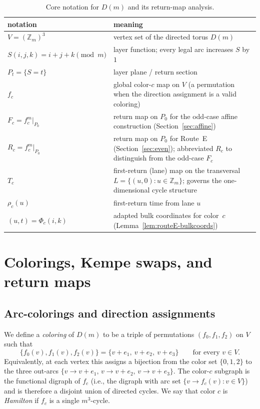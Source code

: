\documentclass[11pt]{article}
\begin{document}
\begin{table}[t]
\centering
\footnotesize
\begin{tabularx}{\textwidth}{@{}l>{\raggedright\arraybackslash}X@{}}
\toprule
notation & meaning \\
\midrule
$V=(\mathbb Z_m)^3$ & vertex set of the directed torus $D(m)$ \\
$S(i,j,k)=i+j+k\pmod m$ & layer function; every legal arc increases $S$ by $1$ \\
$P_t=\{S=t\}$ & layer plane / return section \\
$f_c$ & global color-$c$ map on $V$ (a permutation when the direction assignment is a valid coloring) \\
$F_c=f_c^m|_{P_0}$ & return map on $P_0$ for the odd-case affine construction (Section~\ref{sec:affine}) \\
$R_c=f_c^m|_{P_0}$ & return map on $P_0$ for Route~E (Section~\ref{sec:even}); abbreviated $R_c$ to distinguish from the odd-case $F_c$ \\
$T_c$ & first-return (lane) map on the transversal $L=\{(u,0):u\in\mathbb Z_m\}$; governs the one-dimensional cycle structure \\
$\rho_c(u)$ & first-return time from lane $u$ \\
$(u,t)=\Phi_c(i,k)$ & adapted bulk coordinates for color~$c$ (Lemma~\ref{lem:routeE-bulkcoords}) \\
\bottomrule
\end{tabularx}
\caption{Core notation for $D(m)$ and its return-map analysis.}
\label{tab:notation}
\end{table}

\section{Colorings, Kempe swaps, and return maps}\label{sec:prelim}

\subsection{Arc-colorings and direction assignments}
We define a \emph{coloring} of $D(m)$ to be a triple of permutations $(f_0,f_1,f_2)$ on $V$ such that
\[
\{f_0(v),f_1(v),f_2(v)\}=\{v+e_1,\ v+e_2,\ v+e_3\}
\qquad\text{for every }v\in V.
\]
Equivalently, at each vertex this assigns a bijection from the color set $\{0,1,2\}$ to the three out-arcs $\{v\to v+e_1,\, v\to v+e_2,\, v\to v+e_3\}$.
The color-$c$ subgraph is the functional digraph of $f_c$ (i.e., the digraph with arc set $\{v\to f_c(v):v\in V\}$) and is therefore a disjoint union of directed cycles.
We say that color $c$ is \emph{Hamilton} if $f_c$ is a single $m^3$-cycle.
\end{document}
